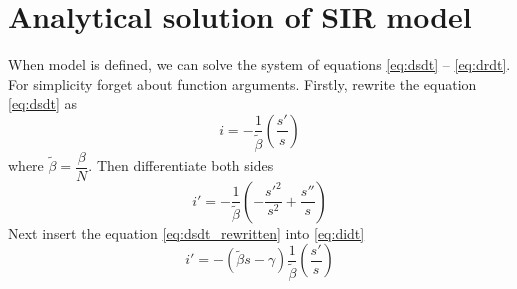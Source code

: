 \documentclass[12pt, a4paper]{article}
\begin{document}
	\section{Analytical solution of SIR model}
	When model is defined, we can solve the system of equations \eqref{eq:dsdt} -- \eqref{eq:drdt}. For simplicity forget about function arguments. Firstly, rewrite the equation \eqref{eq:dsdt} as
	\begin{equation} \label{eq:dsdt_rewritten}
		i = - \frac{1}{\tilde{\beta}} (\frac{s'}{s})
	\end{equation}
	where $\tilde{\beta} = \dfrac{\beta}{N}$. Then differentiate both sides
	\begin{equation} \label{eq:di_1}
		i' = - \frac{1}{\tilde{\beta}} (- \frac{{s'}^2}{s^2} + \frac{s''}{s})
	\end{equation}
	Next insert the equation \eqref{eq:dsdt_rewritten} into \eqref{eq:didt}
	\begin{equation} \label{eq:di_2}
		i' = -(\tilde{\beta} s - \gamma) \frac{1}{\tilde{\beta}} (\frac{s'}{s})
	\end{equation}

	\newpage
	
\end{document}
